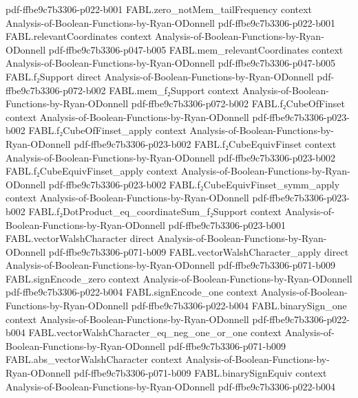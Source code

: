 \begin{theorem}
  {pdf-ffbe9c7b3306-p022-b001}
\proofstep
  {FABL.zero_notMem_tailFrequency}
  {context}
  {Analysis-of-Boolean-Functions-by-Ryan-ODonnell}
  {pdf-ffbe9c7b3306-p022-b001}
\proofstep
  {FABL.relevantCoordinates}
  {context}
  {Analysis-of-Boolean-Functions-by-Ryan-ODonnell}
  {pdf-ffbe9c7b3306-p047-b005}
\proofstep
  {FABL.mem_relevantCoordinates}
  {context}
  {Analysis-of-Boolean-Functions-by-Ryan-ODonnell}
  {pdf-ffbe9c7b3306-p047-b005}
\proofstep
  {FABL.f₂Support}
  {direct}
  {Analysis-of-Boolean-Functions-by-Ryan-ODonnell}
  {pdf-ffbe9c7b3306-p072-b002}
\proofstep
  {FABL.mem_f₂Support}
  {context}
  {Analysis-of-Boolean-Functions-by-Ryan-ODonnell}
  {pdf-ffbe9c7b3306-p072-b002}
\proofstep
  {FABL.f₂CubeOfFinset}
  {context}
  {Analysis-of-Boolean-Functions-by-Ryan-ODonnell}
  {pdf-ffbe9c7b3306-p023-b002}
\proofstep
  {FABL.f₂CubeOfFinset_apply}
  {context}
  {Analysis-of-Boolean-Functions-by-Ryan-ODonnell}
  {pdf-ffbe9c7b3306-p023-b002}
\proofstep
  {FABL.f₂CubeEquivFinset}
  {context}
  {Analysis-of-Boolean-Functions-by-Ryan-ODonnell}
  {pdf-ffbe9c7b3306-p023-b002}
\proofstep
  {FABL.f₂CubeEquivFinset_apply}
  {context}
  {Analysis-of-Boolean-Functions-by-Ryan-ODonnell}
  {pdf-ffbe9c7b3306-p023-b002}
\proofstep
  {FABL.f₂CubeEquivFinset_symm_apply}
  {context}
  {Analysis-of-Boolean-Functions-by-Ryan-ODonnell}
  {pdf-ffbe9c7b3306-p023-b002}
\proofstep
  {FABL.f₂DotProduct_eq_coordinateSum_f₂Support}
  {context}
  {Analysis-of-Boolean-Functions-by-Ryan-ODonnell}
  {pdf-ffbe9c7b3306-p023-b001}
\proofstep
  {FABL.vectorWalshCharacter}
  {direct}
  {Analysis-of-Boolean-Functions-by-Ryan-ODonnell}
  {pdf-ffbe9c7b3306-p071-b009}
\proofstep
  {FABL.vectorWalshCharacter_apply}
  {direct}
  {Analysis-of-Boolean-Functions-by-Ryan-ODonnell}
  {pdf-ffbe9c7b3306-p071-b009}
\proofstep
  {FABL.signEncode_zero}
  {context}
  {Analysis-of-Boolean-Functions-by-Ryan-ODonnell}
  {pdf-ffbe9c7b3306-p022-b004}
\proofstep
  {FABL.signEncode_one}
  {context}
  {Analysis-of-Boolean-Functions-by-Ryan-ODonnell}
  {pdf-ffbe9c7b3306-p022-b004}
\proofstep
  {FABL.binarySign_one}
  {context}
  {Analysis-of-Boolean-Functions-by-Ryan-ODonnell}
  {pdf-ffbe9c7b3306-p022-b004}
\proofstep
  {FABL.vectorWalshCharacter_eq_neg_one_or_one}
  {context}
  {Analysis-of-Boolean-Functions-by-Ryan-ODonnell}
  {pdf-ffbe9c7b3306-p071-b009}
\proofstep
  {FABL.abs_vectorWalshCharacter}
  {context}
  {Analysis-of-Boolean-Functions-by-Ryan-ODonnell}
  {pdf-ffbe9c7b3306-p071-b009}
\proofstep
  {FABL.binarySignEquiv}
  {context}
  {Analysis-of-Boolean-Functions-by-Ryan-ODonnell}
  {pdf-ffbe9c7b3306-p022-b004}

\end{theorem}
